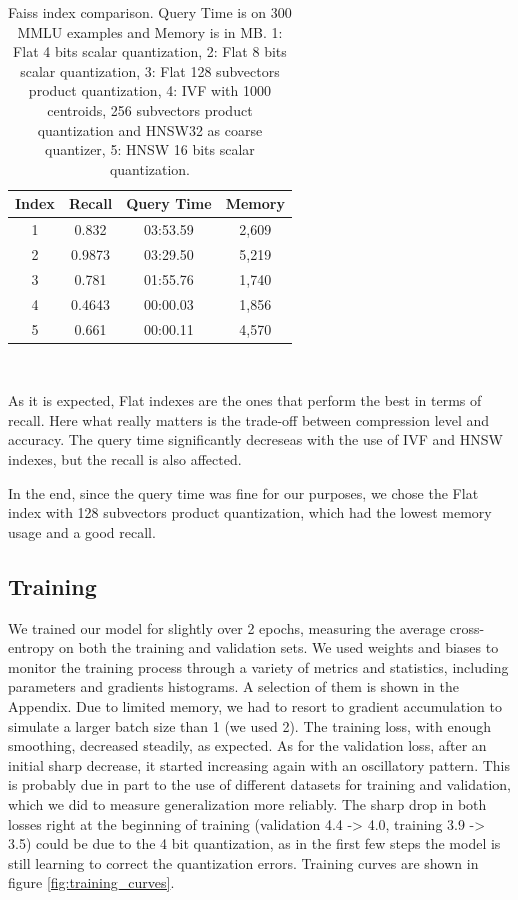 \documentclass[11pt]{article}
\begin{document}
\begin{table}[h]
\centering
\begin{tabular}{|c|c|c|c|}
\hline
Index & Recall & Query Time & Memory \\
\hline
1 & 0.832 & 03:53.59 & 2,609 \\
2 & 0.9873 & 03:29.50 & 5,219 \\
3 & 0.781 & 01:55.76 & 1,740 \\
4 & 0.4643 & 00:00.03 & 1,856 \\
5 & 0.661 & 00:00.11 & 4,570 \\
\hline
\end{tabular}
\caption{Faiss index comparison. Query Time is on 300 MMLU examples and Memory is in MB. 1: Flat 4 bits scalar quantization, 2: Flat 8 bits scalar quantization, 3: Flat 128 subvectors product quantization, 4: IVF with 1000 centroids, 256 subvectors product quantization and HNSW32 as coarse quantizer, 5: HNSW 16 bits scalar quantization.}
\
\label{tab:faiss-index}
\end{table}

As it is expected, Flat indexes are the ones that perform the best in terms of recall.
Here what really matters is the trade-off between compression level and accuracy.
The query time significantly decreseas with the use of IVF and HNSW indexes, but the recall
is also affected.

In the end, since the query time was fine for our purposes, we chose the Flat index with 128
subvectors product quantization, which had the lowest memory usage and a good recall.

\subsection{Training}

We trained our model for slightly over 2 epochs, measuring the average cross-entropy on both the training and validation sets. We used weights
and biases to monitor the training process through a variety of metrics and statistics, including parameters and gradients histograms. A selection of them 
is shown in the Appendix.
Due to limited memory, we had to resort to gradient accumulation to simulate a larger batch size than 1 (we used 2). The training loss, 
with enough smoothing, decreased steadily, as expected. As for the validation loss, after an initial sharp decrease, it started increasing
again with an oscillatory pattern. This is probably due in part to the use of different datasets for training and validation, which we did
to measure generalization more reliably. The sharp drop in both losses right at the beginning of training (validation 4.4 -> 4.0, training 3.9 -> 3.5) could be due to
 the 4 bit quantization, as in the first few steps the model is still learning to correct the quantization errors. Training curves are shown in figure \ref{fig:training_curves}.
\end{document}
